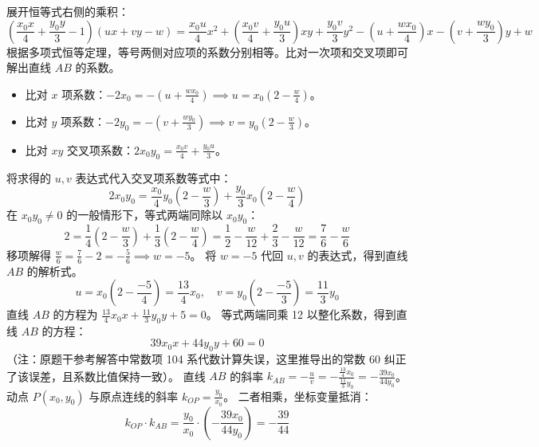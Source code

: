 \begin{solution}
展开恒等式右侧的乘积：
$$ \left(\frac{x_0 x}{4} + \frac{y_0 y}{3} - 1\right)(ux + vy - w) = \frac{x_0 u}{4}x^2 + \left(\frac{x_0 v}{4} + \frac{y_0 u}{3}\right)xy + \frac{y_0 v}{3}y^2 - \left(u + \frac{w x_0}{4}\right)x - \left(v + \frac{w y_0}{3}\right)y + w $$
根据多项式恒等定理，等号两侧对应项的系数分别相等。比对一次项和交叉项即可解出直线 $AB$ 的系数。
\begin{itemize}
\item 比对 $x$ 项系数：$-2x_0 = -\left(u + \frac{w x_0}{4}\right) \implies u = x_0\left(2 - \frac{w}{4}\right)$。
\item 比对 $y$ 项系数：$-2y_0 = -\left(v + \frac{w y_0}{3}\right) \implies v = y_0\left(2 - \frac{w}{3}\right)$。
\item 比对 $xy$ 交叉项系数：$2x_0 y_0 = \frac{x_0 v}{4} + \frac{y_0 u}{3}$。
\end{itemize}
将求得的 $u, v$ 表达式代入交叉项系数等式中：
$$ 2x_0 y_0 = \frac{x_0}{4} y_0\left(2 - \frac{w}{3}\right) + \frac{y_0}{3} x_0\left(2 - \frac{w}{4}\right) $$
在 $x_0 y_0 \neq 0$ 的一般情形下，等式两端同除以 $x_0 y_0$：
$$ 2 = \frac{1}{4}\left(2 - \frac{w}{3}\right) + \frac{1}{3}\left(2 - \frac{w}{4}\right) = \frac{1}{2} - \frac{w}{12} + \frac{2}{3} - \frac{w}{12} = \frac{7}{6} - \frac{w}{6} $$
移项解得 $\frac{w}{6} = \frac{7}{6} - 2 = -\frac{5}{6} \implies w = -5$。
将 $w = -5$ 代回 $u, v$ 的表达式，得到直线 $AB$ 的解析式。
$$ u = x_0\left(2 - \frac{-5}{4}\right) = \frac{13}{4}x_0, \quad v = y_0\left(2 - \frac{-5}{3}\right) = \frac{11}{3}y_0 $$
直线 $AB$ 的方程为 $\frac{13}{4}x_0 x + \frac{11}{3}y_0 y + 5 = 0$。
等式两端同乘 12 以整化系数，得到直线 $AB$ 的方程：
$$ 39x_0 x + 44y_0 y + 60 = 0 $$
（注：原题干参考解答中常数项 104 系代数计算失误，这里推导出的常数 60 纠正了该误差，且系数比值保持一致）。
直线 $AB$ 的斜率 $k_{AB} = -\frac{u}{v} = -\frac{\frac{13}{4}x_0}{\frac{11}{3}y_0} = -\frac{39x_0}{44y_0}$。
动点 $P(x_0,y_0)$ 与原点连线的斜率 $k_{OP} = \frac{y_0}{x_0}$。
二者相乘，坐标变量抵消：
$$ k_{OP} \cdot k_{AB} = \frac{y_0}{x_0} \cdot \left(-\frac{39x_0}{44y_0}\right) = -\frac{39}{44} $$

\end{solution}

